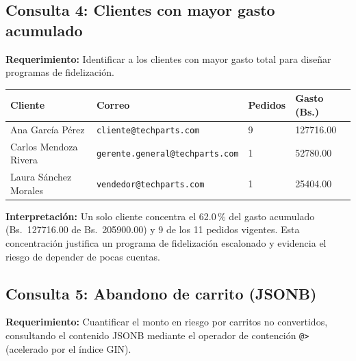 \subsection{Consulta 4: Clientes con mayor gasto acumulado}

\textbf{Requerimiento:} Identificar a los clientes con mayor gasto total para diseñar programas de fidelización.



\begin{center}
\label{tab:q4}
\begin{tablaAPA}
\begin{tabular}{L{3.6cm} L{5.4cm} R{1.7cm} R{2.6cm}}
\toprule
\textbf{Cliente} & \textbf{Correo} & \textbf{Pedidos} & \textbf{Gasto (Bs.)} \\
\midrule
Ana García Pérez & \texttt{cliente@techparts.com} & 9 & 127716.00 \\
Carlos Mendoza Rivera & \texttt{gerente.general@techparts.com} & 1 & 52780.00 \\
Laura Sánchez Morales & \texttt{vendedor@techparts.com} & 1 & 25404.00 \\
\bottomrule
\end{tabular}
\end{tablaAPA}
\end{center}

\textbf{Interpretación:} Un solo cliente concentra el 62.0\,\% del gasto acumulado (Bs.\ 127716.00 de Bs.\ 205900.00) y 9 de los 11 pedidos vigentes.
Esta concentración justifica un programa de fidelización escalonado y evidencia el riesgo de depender de pocas cuentas.

\subsection{Consulta 5: Abandono de carrito (JSONB)}

\textbf{Requerimiento:} Cuantificar el monto en riesgo por carritos no convertidos, consultando el contenido JSONB mediante el operador de contención \texttt{@>} (acelerado por el índice GIN).



